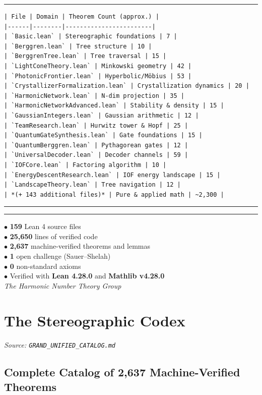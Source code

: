 \documentclass[12pt,a4paper,openany]{book}
\begin{document}
\bigskip\hrule\bigskip


\begin{verbatim}
| File | Domain | Theorem Count (approx.) |
|------|--------|------------------------|
| `Basic.lean` | Stereographic foundations | 7 |
| `Berggren.lean` | Tree structure | 10 |
| `BerggrenTree.lean` | Tree traversal | 15 |
| `LightConeTheory.lean` | Minkowski geometry | 42 |
| `PhotonicFrontier.lean` | Hyperbolic/Möbius | 53 |
| `CrystallizerFormalization.lean` | Crystallization dynamics | 20 |
| `HarmonicNetwork.lean` | N-dim projection | 35 |
| `HarmonicNetworkAdvanced.lean` | Stability & density | 15 |
| `GaussianIntegers.lean` | Gaussian arithmetic | 12 |
| `TeamResearch.lean` | Hurwitz tower & Hopf | 25 |
| `QuantumGateSynthesis.lean` | Gate foundations | 15 |
| `QuantumBerggren.lean` | Pythagorean gates | 12 |
| `UniversalDecoder.lean` | Decoder channels | 59 |
| `IOFCore.lean` | Factoring algorithm | 10 |
| `EnergyDescentResearch.lean` | IOF energy landscape | 15 |
| `LandscapeTheory.lean` | Tree navigation | 12 |
| *(+ 143 additional files)* | Pure & applied math | ~2,300 |
\end{verbatim}

\bigskip\hrule\bigskip

\bigskip\hrule\bigskip


\noindent$\bullet$ \textbf{159} Lean 4 source files\\
\noindent$\bullet$ \textbf{25,650} lines of verified code\\
\noindent$\bullet$ \textbf{2,637} machine-verified theorems and lemmas\\
\noindent$\bullet$ \textbf{1} open challenge (Sauer–Shelah)\\
\noindent$\bullet$ \textbf{0} non-standard axioms\\
\noindent$\bullet$ Verified with \textbf{Lean 4.28.0} and \textbf{Mathlib v4.28.0}\\

\textit{The Harmonic Number Theory Group}

\clearpage

\chapter{The Stereographic Codex}
\textit{Source: \texttt{GRAND\_UNIFIED\_CATALOG.md}}


\section{Complete Catalog of 2,637 Machine-Verified Theorems}
\end{document}
